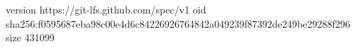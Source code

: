 version https://git-lfs.github.com/spec/v1
oid sha256:f0595687eba98c00e4d6c84226926764842a049239f87392de249be29288f296
size 431099

